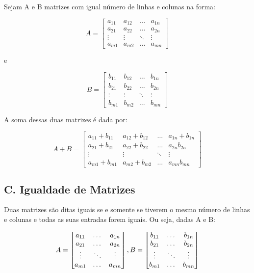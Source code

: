 \documentclass[twocolumn, 10pt]{extarticle}
\begin{document}
Sejam A e B matrizes com igual número de linhas e colunas na forma:

\[ 
A = 
\begin{bmatrix}
a_{11} & a_{12} & \dots & a_{1n} \\
a_{21} & a_{22} & \dots & a_{2n} \\
\vdots & \vdots & \ddots & \vdots \\
a_{m1} & a_{m2} & \dots & a_{mn} 

\end{bmatrix}
\]

e

\[ 
B = 
\begin{bmatrix}
b_{11} & b_{12} & \dots & b_{1n} \\
b_{21} & b_{22} & \dots & b_{2n} \\
\vdots & \vdots & \ddots & \vdots \\
b_{m1} & b_{m2} & \dots & b_{mn} 

\end{bmatrix}
\]

A soma dessas duas matrizes é dada por:

\[ 
A + B = 
\begin{bmatrix}
a_{11} + b_{11} & a_{12} + b_{12} & \dots & a_{1n} + b_{1n} \\
a_{21} + b_{21} & a_{22} + b_{22} & \dots & a_{2n} b_{2n} \\
\vdots & \vdots & \ddots & \vdots \\
a_{m1} + b_{m1} & a_{m2} + b_{m2} & \dots & a_{mn} b_{mn} 

\end{bmatrix}
\]

\subsection*{C. \quad Igualdade de Matrizes}

Duas matrizes são ditas iguais se e somente se tiverem o mesmo número de linhas e colunas e todas as suas entradas forem iguais. Ou seja, dadas A e B:

\[ 
A = 
\begin{bmatrix}
a_{11} & \dots & a_{1n} \\
a_{21} & \dots & a_{2n} \\
\vdots & \ddots & \vdots \\
a_{m1} & \dots & a_{mn} 

\end{bmatrix},  \\ 
B = 
\begin{bmatrix}
b_{11}  & \dots & b_{1n} \\
b_{21}  & \dots & b_{2n} \\
\vdots  & \ddots & \vdots \\
b_{m1}  & \dots & b_{mn} 

\end{bmatrix}
\]
\end{document}
